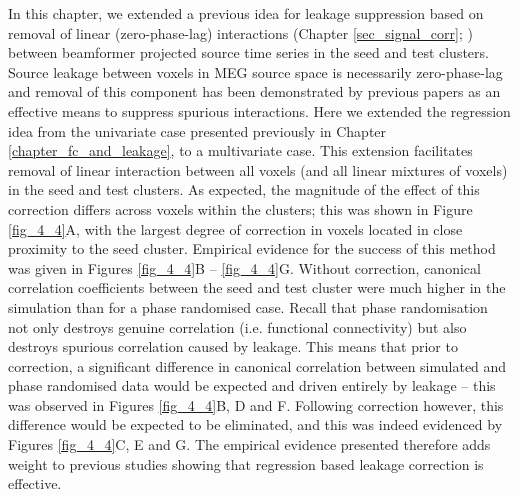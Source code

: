 In this chapter, we extended a previous idea for leakage suppression based on removal of linear (zero-phase-lag) interactions (Chapter \ref{sec_signal_corr}; \cite{Brookes2012b,Hipp2012}) between beamformer projected source time series in the seed and test clusters. Source leakage between voxels in MEG source space is necessarily zero-phase-lag and removal of this component has been demonstrated by previous papers \citep{Brookes2012b,Hipp2012} as an effective means to suppress spurious interactions. Here we extended the regression idea from the univariate case presented previously in Chapter \ref{chapter_fc_and_leakage}, to a multivariate case. This extension facilitates removal of linear interaction between all voxels (and all linear mixtures of voxels) in the seed and test clusters. As expected, the magnitude of the effect of this correction differs across voxels within the clusters; this was shown in Figure \ref{fig_4_4}A, with the largest degree of correction in voxels located in close proximity to the seed cluster. Empirical evidence for the success of this method was given in Figures \ref{fig_4_4}B – \ref{fig_4_4}G. Without correction, canonical correlation coefficients between the seed and test cluster were much higher in the simulation than for a phase randomised case. Recall that phase randomisation not only destroys genuine correlation (i.e. functional connectivity) but also destroys spurious correlation caused by leakage. This means that prior to correction, a significant difference in canonical correlation between simulated and phase randomised data would be expected and driven entirely by leakage – this was observed in Figures \ref{fig_4_4}B, D and F. Following correction however, this difference would be expected to be eliminated, and this was indeed evidenced by Figures \ref{fig_4_4}C, E and G. The empirical evidence presented therefore adds weight to previous studies \citep{Brookes2012b,Hipp2012} showing that regression based leakage correction is effective.

